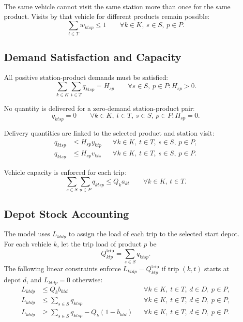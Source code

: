 \documentclass[11pt,a4paper]{article}
\begin{document}
The same vehicle cannot visit the same station more than once for the same
product. Visits by that vehicle for different products remain possible:
\begin{equation}
    \sum_{t \in T} w_{ktsp} \leq 1
    \qquad \forall k \in K,\ s \in S,\ p \in P.
\label{eq:one-visit-station-product}
\end{equation}

\subsection{Demand Satisfaction and Capacity}

All positive station-product demands must be satisfied:
\begin{equation}
    \sum_{k \in K}\sum_{t \in T} q_{ktsp} = H_{sp}
    \qquad \forall s \in S,\ p \in P: H_{sp}>0.
\label{eq:demand}
\end{equation}

No quantity is delivered for a zero-demand station-product pair:
\begin{equation}
    q_{ktsp}=0
    \qquad \forall k \in K,\ t \in T,\ s \in S,\ p \in P: H_{sp}=0.
\label{eq:zero-demand}
\end{equation}

Delivery quantities are linked to the selected product and station visit:
\begin{align}
    q_{ktsp} &\leq H_{sp} y_{ktp}
        && \forall k \in K,\ t \in T,\ s \in S,\ p \in P, \label{eq:quantity-product}\\
    q_{ktsp} &\leq H_{sp} v_{kts}
        && \forall k \in K,\ t \in T,\ s \in S,\ p \in P. \label{eq:quantity-visit}
\end{align}

Vehicle capacity is enforced for each trip:
\begin{equation}
    \sum_{s \in S}\sum_{p \in P} q_{ktsp}
    \leq Q_k a_{kt}
    \qquad \forall k \in K,\ t \in T.
\label{eq:capacity}
\end{equation}

\subsection{Depot Stock Accounting}

The model uses \(L_{ktdp}\) to assign the load of each trip to the selected
start depot. For each vehicle \(k\), let the trip load of product \(p\) be
\[
    Q^{\mathrm{trip}}_{ktp} = \sum_{s \in S} q_{ktsp}.
\]
The following linear constraints enforce
\(L_{ktdp}=Q^{\mathrm{trip}}_{ktp}\) if trip \((k,t)\) starts at depot \(d\),
and \(L_{ktdp}=0\) otherwise:
\begin{align}
    L_{ktdp} &\leq Q_k b_{ktd}
        && \forall k \in K,\ t \in T,\ d \in D,\ p \in P, \label{eq:load-start}\\
    L_{ktdp} &\leq \sum_{s \in S} q_{ktsp}
        && \forall k \in K,\ t \in T,\ d \in D,\ p \in P, \label{eq:load-upper}\\
    L_{ktdp} &\geq \sum_{s \in S} q_{ktsp} - Q_k(1-b_{ktd})
        && \forall k \in K,\ t \in T,\ d \in D,\ p \in P. \label{eq:load-lower}
\end{align}
\end{document}
